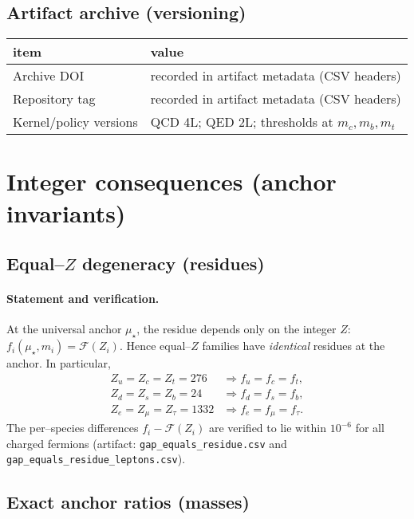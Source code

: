 \documentclass[epjc3]{svjour3}
\begin{document}
\subsection*{Artifact archive (versioning)}
\begin{center}
\begin{tabular}{l l}
\toprule
item & value \\ \midrule
Archive DOI & recorded in artifact metadata (CSV headers) \\
Repository tag & recorded in artifact metadata (CSV headers) \\
Kernel/policy versions & QCD 4L; QED 2L; thresholds at $m_c,m_b,m_t$ \\
\bottomrule
\end{tabular}
\end{center}

\section{Integer consequences (anchor invariants)}

\subsection{Equal--$Z$ degeneracy (residues)}
\paragraph{Statement and verification.}
At the universal anchor $\mu_\star$, the residue depends only on the integer $Z$:
$f_i(\mu_\star,m_i)=\mathcal F(Z_i)$.  Hence equal--$Z$ families have \emph{identical} residues at the anchor.  In particular,
\begin{align*}
  Z_u=Z_c=Z_t=276 &\Longrightarrow f_u=f_c=f_t, \\
  Z_d=Z_s=Z_b=24 &\Longrightarrow f_d=f_s=f_b, \\
  Z_e=Z_\mu=Z_\tau=1332 &\Longrightarrow f_e=f_\mu=f_\tau.
\end{align*}
The per--species differences $f_i-\mathcal F(Z_i)$ are verified to lie within $10^{-6}$ for all charged fermions (artifact: \texttt{gap\_equals\_residue.csv} and \texttt{gap\_equals\_residue\_leptons.csv}).

\subsection{Exact anchor ratios (masses)}
\end{document}

